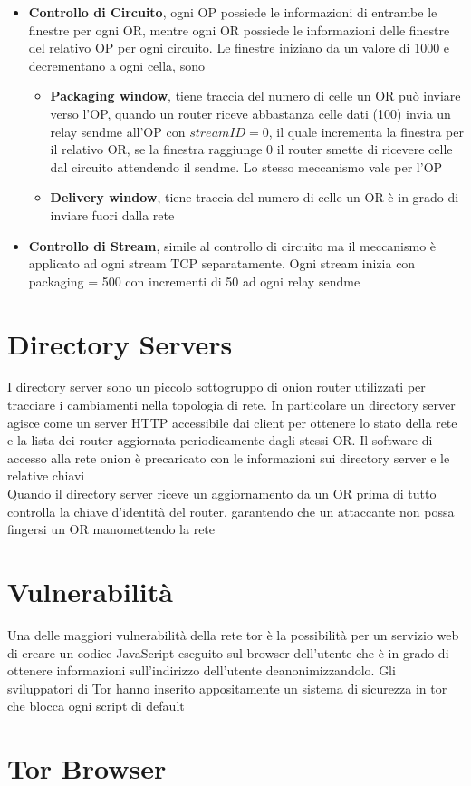 \begin{itemize}
    \item \textbf{Controllo di Circuito}, ogni OP possiede le informazioni di entrambe le finestre per ogni OR, mentre ogni OR possiede le informazioni delle finestre del relativo OP per ogni circuito. Le finestre iniziano da un valore di 1000 e decrementano a ogni cella, sono
    \begin{itemize}
        \item \textbf{Packaging window}, tiene traccia del numero di celle un OR può inviare verso l'OP, quando un router riceve abbastanza celle dati (100) invia un relay sendme all'OP con $streamID = 0$, il quale incrementa la finestra per il relativo OR, se la finestra raggiunge 0 il router smette di ricevere celle dal circuito attendendo il sendme. Lo stesso meccanismo vale per l'OP
        \item \textbf{Delivery window}, tiene traccia del numero di celle un OR è in grado di inviare fuori dalla rete
    \end{itemize}
    \item \textbf{Controllo di Stream}, simile al controllo di circuito ma il meccanismo è applicato ad ogni stream TCP separatamente. Ogni stream inizia con packaging = 500 con incrementi di 50 ad ogni relay sendme
\end{itemize}

\newpage
\section{Directory Servers}
I directory server sono un piccolo sottogruppo di onion router utilizzati per tracciare i cambiamenti nella topologia di rete. In particolare un directory server agisce come un server HTTP accessibile dai client per ottenere lo stato della rete e la lista dei router aggiornata periodicamente dagli stessi OR. Il software di accesso alla rete onion è precaricato con le informazioni sui directory server e le relative chiavi \\
Quando il directory server riceve un aggiornamento da un OR prima di tutto controlla la chiave d'identità del router, garantendo che un attaccante non possa fingersi un OR manomettendo la rete \cite{ChaumMixes}
\section{Vulnerabilità} %
Una delle maggiori vulnerabilità della rete tor è la possibilità per un servizio web di creare un codice JavaScript eseguito sul browser dell'utente che è in grado di ottenere informazioni sull'indirizzo dell'utente deanonimizzandolo. Gli sviluppatori di Tor hanno inserito appositamente un sistema di sicurezza in tor che blocca ogni script di default

\section{Tor Browser}
